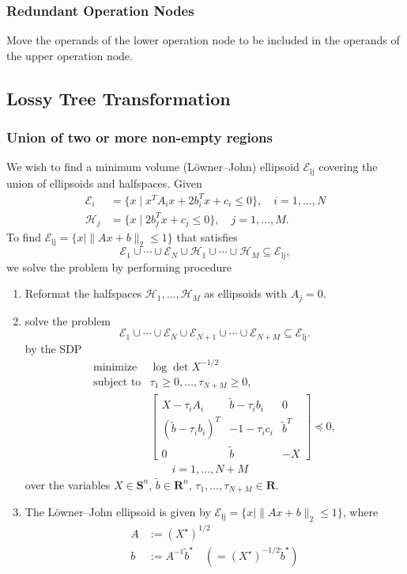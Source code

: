 \documentclass[letterpaper, 10 pt, conference]{ieeeconf}  %
\begin{document}
\subsubsection{Redundant Operation Nodes}
Move the operands of the lower operation node to be included in the operands of the upper operation node.
\subsection{Lossy Tree Transformation}

\subsubsection{Union of two or more non-empty regions}
We wish to find a minimum volume (L\"owner--John) ellipsoid
$\mathcal{E}_\mathrm{lj}$ covering the union of ellipsoids and halfspaces. Given
\begin{align*}
	\mathcal{E}_i &= \{ x \mid x^T A_i x + 2 b_i^Tx + c_i \leq 0 \}, \quad i=1,\ldots,N\\
	\mathcal{H}_j &= \{ x \mid 2b_j^Tx + c_j \leq 0 \}, \quad j=1,\ldots,M.
\end{align*}
To find $\mathcal{E}_\mathrm{lj} = \{ x \mid \|Ax + b\|_2 \leq 1 \}$ that satisfies
\[
	\mathcal{E}_1 \cup \cdots \cup \mathcal{E}_N
	\cup
	\mathcal{H}_1 \cup \cdots \cup \mathcal{H}_M
	\subseteq
	\mathcal{E}_\mathrm{lj},
\]
we solve the problem by performing procedure
\begin{enumerate}
	\item Reformat the halfspaces $\mathcal{H}_1,\ldots,\mathcal{H}_M$ as
		ellipsoids with $A_j = 0$.
	\item solve the problem
	\[
		\mathcal{E}_1 \cup \cdots \cup \mathcal{E}_N
		\cup
		\mathcal{E}_{N+1} \cup \cdots \cup \mathcal{E}_{N+M}
		\subseteq
		\mathcal{E}_\mathrm{lj}.
	\]
	by the SDP~\cite[\S{}8.4.1]{Boyd:2004}
	\[
		\begin{array}{ll}
			\mbox{minimize}   & \log \det X^{-1/2} \\
			\mbox{subject to} 
				& \tau_1 \geq 0, \ldots, \tau_{N+M} \geq 0,\\
				& \begin{bmatrix}
					X - \tau_i A_i & \tilde{b} - \tau_i b_i & 0\\
					(\tilde{b} - \tau_i b_i)^T & -1 - \tau_i c_i & {\tilde{b}}^T \\
					0 & {\tilde{b}} & -X
				\end{bmatrix}
				\preceq 0, \\
				& \qquad i=1,\ldots,N+M
		\end{array}
	\]
	over the variables $X \in \mathbf{S}^n$, $\tilde{b} \in \mathbf{R}^n$,
	$\tau_1,\ldots,\tau_{N+M} \in \mathbf{R}$.
	\item The L\"owner--John ellipsoid is given by 
		$\mathcal{E}_\mathrm{lj} = \{ x \mid \|Ax + b\|_2 \leq 1 \}$, where
		\begin{align*}
			A &:= (X^\star)^{1/2}\\
			b &:= A^{-1}{\tilde{b}}^\star \quad (= (X^\star)^{-1/2} {\tilde{b}}^\star)
		\end{align*}
\end{enumerate}
\end{document}
